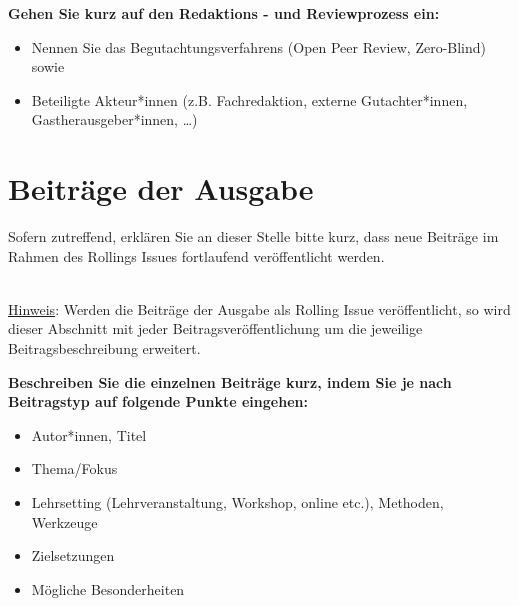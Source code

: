 \documentclass[
          a4paper,
        ]{article}
\begin{document}
\textbf{Gehen Sie kurz auf den Redaktions - und Reviewprozess ein:}

\begin{itemize}
\item
  Nennen Sie das Begutachtungsverfahrens (Open Peer Review, Zero-Blind)
  sowie
\item
  Beteiligte Akteur*innen (z.B. Fachredaktion, externe Gutachter*innen,
  Gastherausgeber*innen, \ldots)
\end{itemize}

\section{Beiträge der Ausgabe}\label{beitruxe4ge-der-ausgabe}

Sofern zutreffend, erklären Sie an dieser Stelle bitte kurz, dass neue
Beiträge im Rahmen des Rollings Issues fortlaufend veröffentlicht
werden.\\
\strut \\
\ul{Hinweis}: Werden die Beiträge der Ausgabe als Rolling Issue
veröffentlicht, so wird dieser Abschnitt mit jeder
Beitragsveröffentlichung um die jeweilige Beitragsbeschreibung
erweitert.

\textbf{\hfill\break
Beschreiben Sie die einzelnen Beiträge kurz, indem Sie je nach
Beitragstyp auf folgende Punkte eingehen:}

\begin{itemize}
\item
  Autor*innen, Titel
\item
  Thema/Fokus
\item
  Lehrsetting (Lehrveranstaltung, Workshop, online etc.), Methoden,
  Werkzeuge
\item
  Zielsetzungen
\item
  Mögliche Besonderheiten
\end{itemize}
\end{document}
